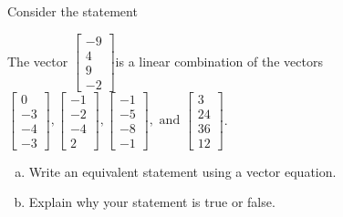 
\begin{exerciseStatement}


Consider the statement 
\begin{center}\begin{minipage}{0.8\textwidth}
 The vector \( \left[\begin{array}{c}
-9 \\
4 \\
9 \\
-2
\end{array}\right] \)is a linear combination of the vectors \( \left[\begin{array}{c}
0 \\
-3 \\
-4 \\
-3
\end{array}\right] , \left[\begin{array}{c}
-1 \\
-2 \\
-4 \\
2
\end{array}\right] , \left[\begin{array}{c}
-1 \\
-5 \\
-8 \\
-1
\end{array}\right] , \text{ and } \left[\begin{array}{c}
3 \\
24 \\
36 \\
12
\end{array}\right] \). 
\end{minipage}\end{center}
    


\begin{enumerate}[(a)]
\item  Write an equivalent statement using a vector equation.
\item  Explain why your statement is true or false.
\end{enumerate}
    
\end{exerciseStatement}
    
